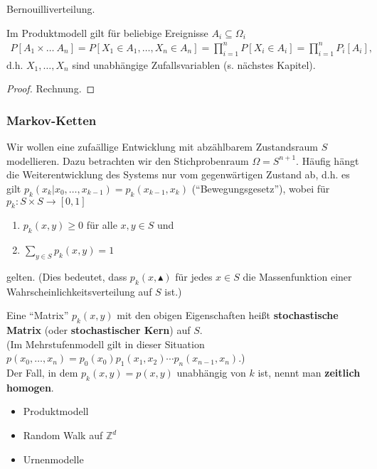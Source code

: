 \begin{beispiel} Bernouilliverteilung.
\end{beispiel}

\begin{satz} Im Produktmodell gilt f\"ur beliebige Ereignisse $A_i \subseteq
\Omega_i$
\begin{eqnarray}
P[A_1 \times \ldots \ A_n] = P[X_1 \in A_1, \ldots, X_n \in A_n] =
\prod_{i=1}^n P[X_i \in A_i] = \prod_{i=1}^n P_i[A_i], \nonumber
\end{eqnarray}
d.h. $X_1, \ldots, X_n$ sind unabh\"angige Zufallsvariablen (s. n\"achstes
Kapitel).
\end{satz}
\begin{proof} Rechnung.
\end{proof}

\subsubsection{Markov-Ketten}
Wir wollen eine zufa\"allige Entwicklung mit abz\"ahlbarem Zustandsraum $S$
modellieren. Dazu betrachten wir den Stichprobenraum $\Omega = S^{n+1}$.
H\"aufig h\"angt die Weiterentwicklung des Systems nur vom gegenw\"artigen
Zustand ab, d.h. es gilt $p_k(x_k| x_0, \ldots, x_{k-1}) = p_k(x_{k-1}, x_k)$
("`Bewegungsgesetz"'), wobei f\"ur $p_k: S \times S \rightarrow [0,1]$
\begin{enumerate}
\item $p_k(x,y) \geq 0$ f\"ur alle $x,y \in S$ und
\item $\sum_{y \in S} p_k(x,y) = 1$
\end{enumerate}
gelten. (Dies bedeutet, dass $p_k(x, \blacktriangle)$ f\"ur jedes $x \in S$ die
Massenfunktion einer Wahrscheinlichkeitsverteilung auf $S$ ist.)

\begin{definition} Eine "`Matrix"' $p_k(x,y)$ mit den obigen Eigenschaften
hei\ss t \textbf{stochastische Matrix} (oder \textbf{stochastischer Kern}) auf
$S$. \\
(Im Mehrstufenmodell gilt in dieser Situation $p(x_0, \ldots, x_n) = p_0(x_0)
p_1(x_1,x_2) \cdots p_n(x_{n-1}, x_n)$.) \\
Der Fall, in dem $p_k(x,y) = p(x,y)$ unabh\"angig von $k$ ist, nennt man
\textbf{zeitlich homogen}.
\end{definition}

\begin{beispiel} \quad
\begin{itemize}
\item Produktmodell
\item Random Walk auf $\mathbb{Z}^d$
\item Urnenmodelle
\end{itemize}
\end{beispiel}

